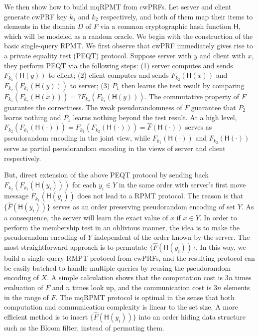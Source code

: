 \documentclass[a4paper,10pt]{article}
\begin{document}
\begin{trivlist}
    We then show how to build mqRPMT from cwPRFs.   
    Let server and client generate cwPRF key $k_1$ and $k_2$ respectively, 
    and both of them map their items to elements in the domain $D$ of $F$ 
    via a common cryptographic hash function $\mathsf{H}$, which will be modeled as a random oracle. 
    We begin with the construction of the basic single-query RPMT.
    We first observe that cwPRF immediately gives rise to a private equality test (PEQT) protocol. 
    Suppose server with $y$ and client with $x$, they perform PEQT via the following steps: 
    (1) server computes and sends $F_{k_1}(\mathsf{H}(y))$ to client; 
    (2) client computes and sends $F_{k_2}(\mathsf{H}(x))$ and $F_{k_2}(F_{k_1}(\mathsf{H}(y)))$ to server; 
    (3) $P_1$ then learns the test result by comparing $F_{k_1}(F_{k_2}(\mathsf{H}(x))) =? F_{k_2}(F_{k_1}(\mathsf{H}(y)))$. 
    The commutative property of $F$ guarantee the correctness. 
    The weak pseudorandomness of $F$ guarantee that $P_2$ learns nothing 
    and $P_1$ learns nothing beyond the test result.  
    At a high level, 
    $F_{k_2}(F_{k_1}(\mathsf{H}(\cdot))) = F_{k_1}(F_{k_2}(\mathsf{H}(\cdot))) = \hat{F}(\mathsf{H}(\cdot))$ 
    serves as pseudorandom encoding in the joint view, 
    while $F_{k_1}(\mathsf{H}(\cdot))$ and $F_{k_2}(\mathsf{H}(\cdot))$ 
    serve as partial pseudorandom encoding in the views of server and client respectively.
    
    But, direct extension of the above PEQT protocol by sending back $F_{k_2}(F_{k_1}(\mathsf{H}(y_i)))$ 
    for each $y_i \in Y$ in the same order with server's first move message $F_{k_1}(\mathsf{H}(y_i))$ 
    does not lead to a RPMT protocol. 
    The reason is that $\{\hat{F}(\mathsf{H}(y_i))\}$ serves as an order preserving pseudorandom encoding of set $Y$. 
    As a consequence, the server will learn the exact value of $x$ if $x \in Y$.  
    In order to perform the membership test in an oblivious manner, 
    the idea is to make the pseudorandom encoding of $Y$ independent of the order known by the server. 
    The most straightforward approach is to permutate $\{\hat{F}(\mathsf{H}(y_i))\}$. 
    In this way, we build a single query RMPT protocol from cwPRFs, 
    and the resulting protocol can be easily batched to handle multiple queries 
    by reusing the pseudorandom encoding of $X$. 
    A simple calculation shows that the computation cost is $3n$ times evaluation of $F$ and $n$ times look up, 
    and the communication cost is $3n$ elements in the range of $F$. 
    The mqRPMT protocol is optimal in the sense that both computation and communication complexity 
    is linear to the set size.  
    A more efficient method is to insert $\{\hat{F}(\mathsf{H}(y_i))\}$ into an order hiding data structure 
    such as the Bloom filter, instead of permuting them. 


\end{trivlist}
\end{document}
